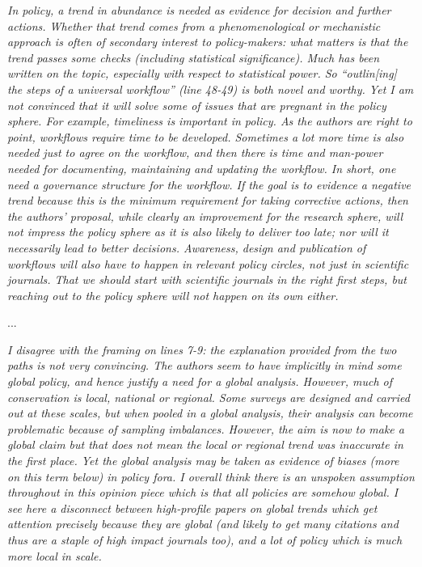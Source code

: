 \documentclass[11pt,letter]{article}
\begin{document}
\begin{mybox}
\emph{In policy, a trend in abundance is needed as evidence for decision and further actions. Whether
that trend comes from a phenomenological or mechanistic approach is often of secondary
interest to policy-makers: what matters is that the trend passes some checks (including
statistical significance). Much has been written on the topic, especially with respect to
statistical power. So “outlin[ing] the steps of a universal workflow” (line 48-49) is both novel
and worthy. Yet I am not convinced that it will solve some of issues that are pregnant in the
policy sphere. For example, timeliness is important in policy. As the authors are right to point,
workflows require time to be developed. Sometimes a lot more time is also needed just to agree
on the workflow, and then there is time and man-power needed for documenting, maintaining
and updating the workflow. In short, one need a governance structure for the workflow. If the
goal is to evidence a negative trend because this is the minimum requirement for taking
corrective actions, then the authors’ proposal, while clearly an improvement for the research
sphere, will not impress the policy sphere as it is also likely to deliver too late; nor will it
necessarily lead to better decisions. Awareness, design and publication of workflows will also
have to happen in relevant policy circles, not just in scientific journals. That we should start
with scientific journals in the right first steps, but reaching out to the policy sphere will not
happen on its own either.}  
\end{mybox}

...

\begin{mybox}
\emph{I disagree with the framing on lines 7-9: the explanation provided from the two paths is not
very convincing. The authors seem to have implicitly in mind some global policy, and hence
justify a need for a global analysis. However, much of conservation is local, national or
regional. Some surveys are designed and carried out at these scales, but when pooled in a
global analysis, their analysis can become problematic because of sampling imbalances.
However, the aim is now to make a global claim but that does not mean the local or regional
trend was inaccurate in the first place. Yet the global analysis may be taken as evidence of
biases (more on this term below) in policy fora. I overall think there is an unspoken assumption
throughout in this opinion piece which is that all policies are somehow global. I see here a
disconnect between high-profile papers on global trends which get attention precisely because
they are global (and likely to get many citations and thus are a staple of high impact journals
too), and a lot of policy which is much more local in scale.}  
\end{mybox}
\end{document}

